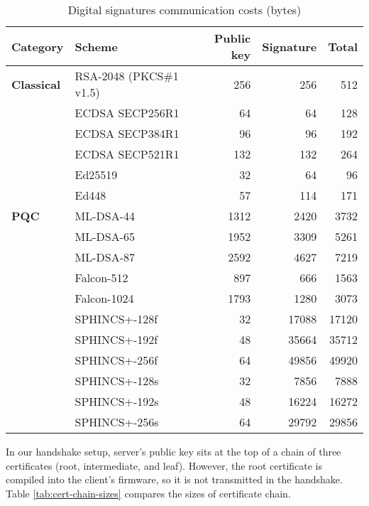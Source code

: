 \documentclass[letterpaper,12pt,titlepage,oneside,final]{book}
\begin{document}
\begin{table}[h]
\centering
\caption{Digital signatures communication costs (bytes)}
\vspace{1em}
\label{tab:sig-sizes}
\footnotesize\begin{tabular}{llrrr}
\toprule
    \textbf{Category} 
    & \textbf{Scheme} 
    & \textbf{Public key} 
    & \textbf{Signature}
    & \textbf{Total} \\
\midrule
\textbf{Classical}
& RSA-2048 (PKCS\#1 v1.5)  & 256   & 256   & 512   \\
& ECDSA SECP256R1          & 64    & 64    & 128   \\
& ECDSA SECP384R1          & 96    & 96    & 192   \\
& ECDSA SECP521R1          & 132   & 132   & 264   \\
& Ed25519                  & 32    & 64    & 96    \\
& Ed448                    & 57    & 114   & 171   \\
\midrule
\textbf{PQC}

& ML-DSA-44                & 1312  & 2420  & 3732  \\
& ML-DSA-65                & 1952  & 3309  & 5261  \\
& ML-DSA-87                & 2592  & 4627  & 7219  \\
& Falcon-512               & 897   & 666   & 1563  \\
& Falcon-1024              & 1793  & 1280  & 3073  \\

& SPHINCS+-128f            & 32    & 17088 & 17120 \\
& SPHINCS+-192f            & 48    & 35664 & 35712 \\
& SPHINCS+-256f            & 64    & 49856 & 49920 \\

& SPHINCS+-128s            & 32    & 7856  & 7888  \\
& SPHINCS+-192s            & 48    & 16224 & 16272 \\
& SPHINCS+-256s            & 64    & 29792 & 29856 \\
\bottomrule
\end{tabular}
\end{table}

In our handshake setup, server's public key sits at the top of a chain of three certificates (root, intermediate, and leaf).
However, the root certificate is compiled into the client's firmware, so it is not transmitted in the handshake.
Table \ref{tab:cert-chain-sizes} compares the sizes of certificate chain.
\end{document}
